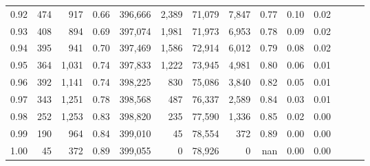 \begin{tabular}{rrrrrrrrrrrrrr}
0.92 &    474 &    917 &  0.66 &  396,666 &    2,389 &  71,079 &   7,847 &  0.77 &  0.10 &      0.02 \\
0.93 &    408 &    894 &  0.69 &  397,074 &    1,981 &  71,973 &   6,953 &  0.78 &  0.09 &      0.02 \\
0.94 &    395 &    941 &  0.70 &  397,469 &    1,586 &  72,914 &   6,012 &  0.79 &  0.08 &      0.02 \\
0.95 &    364 &  1,031 &  0.74 &  397,833 &    1,222 &  73,945 &   4,981 &  0.80 &  0.06 &      0.01 \\
0.96 &    392 &  1,141 &  0.74 &  398,225 &      830 &  75,086 &   3,840 &  0.82 &  0.05 &      0.01 \\
0.97 &    343 &  1,251 &  0.78 &  398,568 &      487 &  76,337 &   2,589 &  0.84 &  0.03 &      0.01 \\
0.98 &    252 &  1,253 &  0.83 &  398,820 &      235 &  77,590 &   1,336 &  0.85 &  0.02 &      0.00 \\
0.99 &    190 &    964 &  0.84 &  399,010 &       45 &  78,554 &     372 &  0.89 &  0.00 &      0.00 \\
1.00 &     45 &    372 &  0.89 &  399,055 &        0 &  78,926 &       0 &   nan &  0.00 &      0.00 \\
\bottomrule
\end{tabular}
